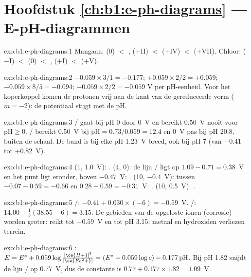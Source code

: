 \section*{Hoofdstuk \ref{ch:b1:e-ph-diagrams} --- E-pH-diagrammen}

\begin{solution}{exo:b1:e-ph-diagrams:1}
Mangaan:  (0) $<$ ,  ($+$II) $<$ 
($+$IV) $<$  ($+$VII). Chloor:  ($-$I) $<$  (0)
$<$ ,  ($+$I) $<$  ($+$V).
\end{solution}

\begin{solution}{exo:b1:e-ph-diagrams:2}
$-0.059 \times 3/1 = -0.177$; $+0.059 \times 2/2 = +0.059$;
$-0.059 \times 8/5 = -0.094$; $-0.059 \times 2/2 = -0.059$ V per
pH-eenheid. Voor het koperkoppel komen de protonen vrij aan de kant van
de gereduceerde vorm ($m = -2$): de potentiaal stijgt met de pH.
\end{solution}

\begin{solution}{exo:b1:e-ph-diagrams:3}
/ gaat bij pH 0 door 0~V en bereikt 0.50~V nooit voor
$\mathrm{pH} \geqslant 0$. / bereikt 0.50~V bij
$\mathrm{pH} = 0.73/0.059 = 12.4$ en 0~V pas bij pH 20.8, buiten de
schaal. De band is bij elke pH \qty{1.23}{V} breed, ook bij pH 7 (van
$-0.41$ tot $+0.82$~V).
\end{solution}

\begin{solution}{exo:b1:e-ph-diagrams:4}
(1, 1.0~V): . (4, 0): de lijn / ligt op
$1.09 - 0.71 = 0.38$~V en het punt ligt eronder, boven $-0.47$~V:
. (10, $-0.4$~V): tussen $-0.07 - 0.59 = -0.66$ en $0.28 -
0.59 = -0.31$~V: . (10, 0.5~V): .
\end{solution}

\begin{solution}{exo:b1:e-ph-diagrams:5}
/: $-0.41 + 0.030 \times (-6) = -0.59$~V.
/: $14.00 - \frac13(38.55 - 6) = 3.15$. De gebieden
van de opgeloste ionen (corrosie) worden groter:  reikt tot
$-0.59$~V en  tot pH 3.15; metaal en hydroxiden verliezen
terrein.
\end{solution}

\begin{solution}{exo:b1:e-ph-diagrams:6}
: $E = E^\circ + 0.059\log\frac{[\ce{H+}]^3}{[\ce{Fe^2+}]}
= (E^\circ - 0.059\log c) - 0.177\,\mathrm{pH}$. Bij pH 1.82 snijdt de
lijn / op 0.77~V, dus de constante is
$0.77 + 0.177 \times 1.82
= 1.09$~V.
\end{solution}

